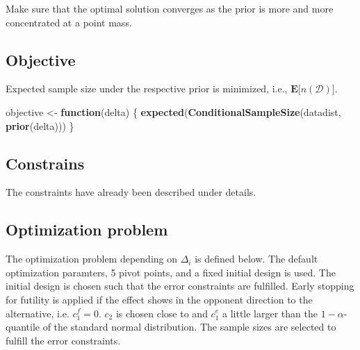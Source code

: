 \documentclass[]{book}
\newenvironment{Shaded}{\begin{snugshade}}{\end{snugshade}}
\newcommand{\ControlFlowTok}[1]{\textcolor[rgb]{0.13,0.29,0.53}{\textbf{#1}}}
\newcommand{\KeywordTok}[1]{\textcolor[rgb]{0.13,0.29,0.53}{\textbf{#1}}}
\newcommand{\NormalTok}[1]{#1}
\newcommand{\StringTok}[1]{\textcolor[rgb]{0.31,0.60,0.02}{#1}}
\begin{document}
Make sure that the optimal solution converges as the prior is more and more
concentrated at a point mass.

\hypertarget{objective-6}{%
\subsection{Objective}\label{objective-6}}

Expected sample size under the respective prior is minimized, i.e.,
\(\boldsymbol{E}\big[n(\mathcal{D})\big]\).

\begin{Shaded}
\begin{Highlighting}[]
\NormalTok{objective <-}\StringTok{ }\ControlFlowTok{function}\NormalTok{(delta) \{}
    \KeywordTok{expected}\NormalTok{(}\KeywordTok{ConditionalSampleSize}\NormalTok{(datadist, }\KeywordTok{prior}\NormalTok{(delta)))}
\NormalTok{\}}
\end{Highlighting}
\end{Shaded}

\hypertarget{constrains-6}{%
\subsection{Constrains}\label{constrains-6}}

The constraints have already been described under details.

\hypertarget{optimization-problem}{%
\subsection{Optimization problem}\label{optimization-problem}}

The optimization problem depending on \(\Delta_i\) is defined below.
The default optimization paramters, 5 pivot points, and a fixed initial design
is used.
The initial design is chosen such that the error constraints are
fulfilled. Early stopping for futility is applied if the effect shows
in the opponent direction to the alternative, i.e. \(c_1^f=0\).
\(c_2\) is chosen close to and \(c_1^e\) a little larger than the \(1-\alpha\)-quantile
of the standard normal distribution. The sample sizes are selected
to fulfill the error constraints.
\end{document}
